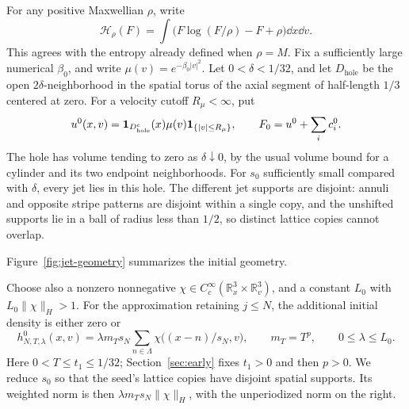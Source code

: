 For any positive Maxwellian \(\rho\), write
\[
 \mathcal H_\rho(F)=\int
       \bigl(F\log(F/\rho)-F+\rho\bigr)\dd x\dd v.
\]
This agrees with the entropy already defined when \(\rho=M\).
Fix a sufficiently large numerical \(\beta_0\), and write
\(\mu(v)=e^{-\beta_0|v|^2}\).  Let \(0<\delta<1/32\), and let
\(D_{\mathrm{hole}}\) be the open \(2\delta\)-neighborhood in the
spatial torus of the axial segment of half-length \(1/3\) centered at
zero.  For a velocity cutoff \(R_\mu<\infty\), put
\begin{equation}
 u^0(x,v)=\mathbf 1_{D_{\mathrm{hole}}^c}(x)
             \mu(v)\mathbf 1_{\{|v|\le R_\mu\}},\qquad
 F_0=u^0+\sum_i c_i^0.
 \label{con:datum-equation}
\end{equation}
The hole has volume tending to zero as \(\delta\downarrow0\), by the
usual volume bound for a cylinder and its two endpoint neighborhoods.
For \(s_0\) sufficiently small compared with \(\delta\), every jet
lies in this hole.  The different jet supports are disjoint: annuli
and opposite stripe patterns are disjoint within a single copy, and
the unshifted supports lie in a ball of radius less than \(1/2\), so
distinct lattice copies cannot overlap.

Figure~\ref{fig:jet-geometry} summarizes the initial geometry.


Choose also a nonzero nonnegative
\(\chi\in C_c^\infty(\mathbb R^3_x\times\mathbb R^3_v)\), and a
constant \(L_0\) with \(L_0\|\chi\|_H>1\).  For the approximation
retaining \(j\le N\), the additional initial density is either zero
or
\begin{equation}
 h^0_{N,T,\lambda}(x,v)
 =\lambda m_Ts_N\sum_{n\in\Lambda}
        \chi\bigl((x-n)/s_N,v\bigr),\qquad
 m_T=T^p,\qquad 0\le\lambda\le L_0.
 \label{con:seed}
\end{equation}
Here \(0<T\le t_1\le1/32\); Section~\ref{sec:early} fixes
\(t_1>0\) and then \(p>0\).  We reduce \(s_0\) so that the seed's
lattice copies have disjoint spatial supports.  Its weighted norm is
then \(\lambda m_Ts_N\|\chi\|_H\), with the unperiodized norm on the
right.

